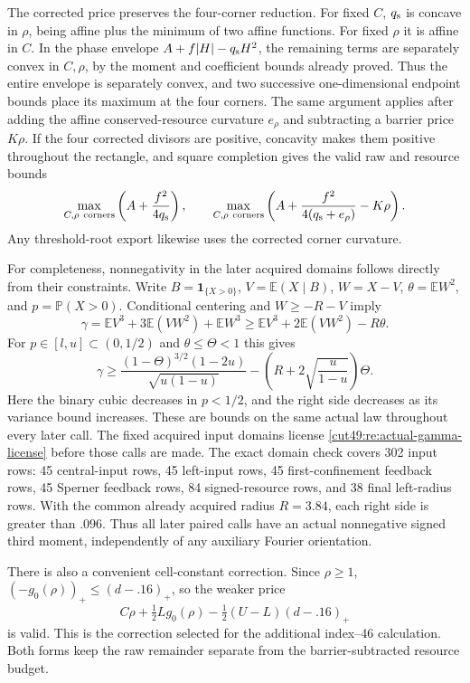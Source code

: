 \documentclass[11pt,a4paper]{article}
\numberwithin{equation}{section}
\theoremstyle{definition}
\theoremstyle{remark}
\begin{document}
The corrected price preserves the four-corner reduction. For fixed $C$,
$q_{\rm s}$ is concave in $\rho$, being affine plus the minimum of two
affine functions. For fixed $\rho$ it is affine in $C$. In the phase
envelope $A+f|H|-q_{\rm s}H^2$, the remaining terms are separately
convex in $C,\rho$, by the moment and coefficient bounds already proved.
Thus the entire envelope is separately convex, and two successive
one-dimensional endpoint bounds place its maximum at the four corners.
The same argument applies after adding the affine conserved-resource
curvature $e_\rho$ and subtracting a barrier price $K\rho$.
If the four corrected divisors are positive, concavity makes them
positive throughout the rectangle, and square completion gives the
valid raw and resource bounds
\[
 \max_{C,\rho\ {\mathrm{corners}}}\left(A+\frac{f^2}{4q_{\rm s}}\right),
 \qquad
 \max_{C,\rho\ {\mathrm{corners}}}
       \left(A+\frac{f^2}{4(q_{\rm s}+e_\rho)}-K\rho\right).
\]
Any threshold-root export likewise uses the corrected corner curvature.

For completeness, nonnegativity in the later acquired domains follows
directly from their constraints. Write $B=\mathbf1_{\{X>0\}}$,
$V=\mathbb E(X\mid B)$,
$W=X-V$, $\theta=\mathbb E W^2$, and $p=\mathbb P(X>0)$. Conditional
centering and $W\ge-R-V$ imply
\[
 \gamma=\mathbb EV^3+3\mathbb E(VW^2)+\mathbb EW^3
 \ge\mathbb EV^3+2\mathbb E(VW^2)-R\theta.
\]
For $p\in[l,u]\subset(0,1/2)$ and $\theta\le\Theta<1$ this gives
\begin{equation}\label{cut49:re:actual-gamma-license}
 \gamma\ge
 \frac{(1-\Theta)^{3/2}(1-2u)}{\sqrt{u(1-u)}}
 -\left(R+2\sqrt{\frac{u}{1-u}}\right)\Theta.
\end{equation}
Here the binary cubic decreases in $p<1/2$, and the right side decreases
as its variance bound increases. These are bounds on the same actual law
throughout every later call. The fixed acquired input domains license
\eqref{cut49:re:actual-gamma-license} before those calls are made.
The exact domain check covers 302 input rows: 45 central-input rows,
45 left-input rows, 45 first-confinement feedback rows, 45 Sperner feedback
rows, 84 signed-resource rows, and 38 final left-radius rows. With the
common already acquired radius $R=3.84$, each right side is greater than
$.096$. Thus all later paired calls have an actual nonnegative signed
third moment, independently of any auxiliary Fourier orientation.

There is also a convenient cell-constant correction. Since $\rho\ge1$,
$(-g_0(\rho))_+\le(d-.16)_+$, so the weaker price
\[
 C\rho+\tfrac12L g_0(\rho)
       -\tfrac12(U-L)(d-.16)_+
\]
is valid. This is the correction selected for the additional index--46
calculation. Both forms keep the raw remainder separate from the
barrier-subtracted resource budget.
\end{document}
